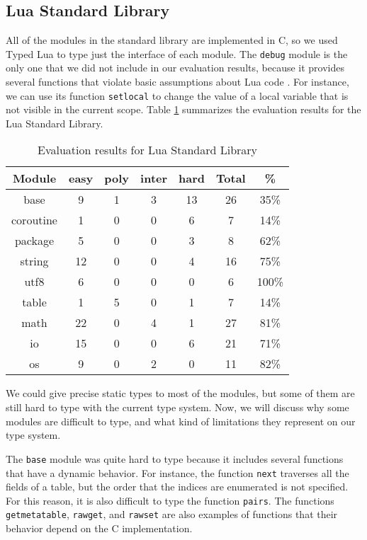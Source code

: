 \subsection{Lua Standard Library}

All of the modules in the standard library are implemented in C, so
we used Typed Lua to type just the interface of each module.
The \texttt{debug} module is the only one that we did not include in our
evaluation results, because it provides several functions that violate
basic assumptions about Lua code \citep{luamanual}.
For instance, we can use its function \texttt{setlocal} to change the value
of a local variable that is not visible in the current scope.
Table \ref{tab:evallsl} summarizes the evaluation results for the Lua Standard Library.

\begin{table}[!ht]
\begin{center}
\begin{tabular}{|c|c|c|c|c|c|c|}
\hline
\textbf{Module} & \textbf{easy} & \textbf{poly} & \textbf{inter} & \textbf{hard} & \textbf{Total} & \textbf{\%} \\
\hline
base & 9 & 1 & 3 & 13 & 26 & 35\% \\
\hline
coroutine & 1 & 0 & 0 & 6 & 7 & 14\% \\
\hline
package & 5 & 0 & 0 & 3 & 8 & 62\% \\
\hline
string & 12 & 0 & 0 & 4 & 16 & 75\% \\
\hline
utf8 & 6 & 0 & 0 & 0 & 6 & 100\% \\
\hline
table & 1 & 5 & 0 & 1 & 7 & 14\% \\
\hline
math & 22 & 0 & 4 & 1 & 27 & 81\% \\
\hline
io & 15 & 0 & 0 & 6 & 21 & 71\% \\
\hline
os & 9 & 0 & 2 & 0 & 11 & 82\% \\
\hline
\end{tabular}
\end{center}
\caption{Evaluation results for Lua Standard Library}
\label{tab:evallsl}
\end{table}

We could give precise static types to most of the modules,
but some of them are still hard to type with the current type
system.
Now, we will discuss why some modules are difficult to type,
and what kind of limitations they represent on our type system.

The \texttt{base} module was quite hard to type because it
includes several functions that have a dynamic behavior.
For instance, the function \texttt{next} traverses all the
fields of a table, but the order that the indices are
enumerated is not specified.
For this reason, it is also difficult to type the function
\texttt{pairs}.
The functions \texttt{getmetatable}, \texttt{rawget}, and
\texttt{rawset} are also examples of functions that their
behavior depend on the C implementation.

